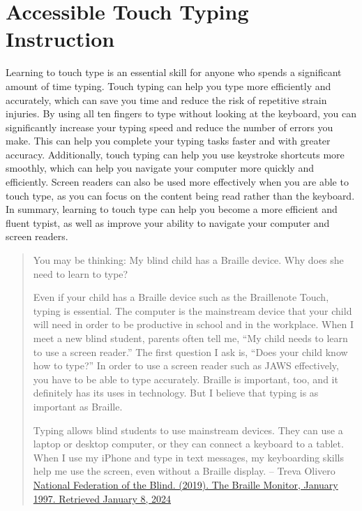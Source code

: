 \pagebreak\hypertarget{appx5}{}\section[Accessible Touch Typing Instruction]{Accessible Touch Typing Instruction}\label{appx5}

Learning to touch type is an essential skill for anyone who spends a significant amount of time typing. Touch typing can help you type more efficiently and accurately, which can save you time and reduce the risk of repetitive strain injuries. By using all ten fingers to type without looking at the keyboard, you can significantly increase your typing speed and reduce the number of errors you make. This can help you complete your typing tasks faster and with greater accuracy. Additionally, touch typing can help you use keystroke shortcuts more smoothly, which can help you navigate your computer more quickly and efficiently. Screen readers can also be used more effectively when you are able to touch type, as you can focus on the content being read rather than the keyboard. In summary, learning to touch type can help you become a more efficient and fluent typist, as well as improve your ability to navigate your computer and screen readers. 

\begin{leftbar}
	\begin{quote}
		You may be thinking: My blind child has a Braille device. Why does she need to learn to type?
		
		Even if your child has a Braille device such as the Braillenote Touch, typing is essential. The computer is the mainstream device that your child will need in order to be productive in school and in the workplace. When I meet a new blind student, parents often tell me, ``My child needs to learn to use a screen reader.'' The first question I ask is, ``Does your child know how to type?'' In order to use a screen reader such as JAWS effectively, you have to be able to type accurately. Braille is important, too, and it definitely has its uses in technology. But I believe that typing is as important as Braille.
		
		Typing allows blind students to use mainstream devices. They can use a laptop or desktop computer, or they can connect a keyboard to a tablet. When I use my iPhone and type in text messages, my keyboarding skills help me use the screen, even without a Braille display.
		\break -- Treva Olivero \break\href{https://nfb.org/images/nfb/publications/fr/fr40/1/fr400103.htm}{National Federation of the Blind. (2019). The Braille Monitor, January 1997. Retrieved January 8, 2024}
	\end{quote}
\end{leftbar}

